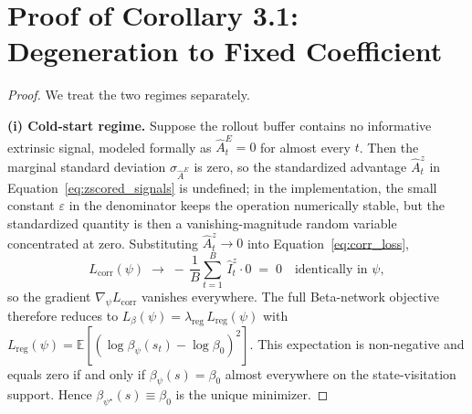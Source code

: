 \section{Proof of Corollary 3.1: Degeneration to Fixed Coefficient}
\label{app:proof_degeneration}

\begin{proof}
We treat the two regimes separately.

\textbf{(i) Cold-start regime.} Suppose the rollout buffer contains no informative extrinsic signal, modeled formally as $\hat A_t^{E} = 0$ for almost every $t$. Then the marginal standard deviation $\sigma_{\hat A^{E}}$ is zero, so the standardized advantage $\hat A_t^{z}$ in Equation~\eqref{eq:zscored_signals} is undefined; in the implementation, the small constant $\varepsilon$ in the denominator keeps the operation numerically stable, but the standardized quantity is then a vanishing-magnitude random variable concentrated at zero. Substituting $\hat A_t^{z} \to 0$ into Equation~\eqref{eq:corr_loss},
\begin{equation*}
L_\text{corr}(\psi) \;\to\; -\,\frac{1}{B}\sum_{t=1}^{B}\, \hat I_t^{z}\cdot 0 \;=\; 0
\quad\text{identically in } \psi,
\end{equation*}
so the gradient $\nabla_\psi L_\text{corr}$ vanishes everywhere. The full Beta-network objective therefore reduces to $L_\beta(\psi) = \lambda_\text{reg}\, L_\text{reg}(\psi)$ with $L_\text{reg}(\psi) = \mathbb{E}[(\log \beta_\psi(s_t) - \log \beta_0)^2]$. This expectation is non-negative and equals zero if and only if $\beta_\psi(s) = \beta_0$ almost everywhere on the state-visitation support. Hence $\beta_{\psi^\star}(s) \equiv \beta_0$ is the unique minimizer.


\end{proof}
